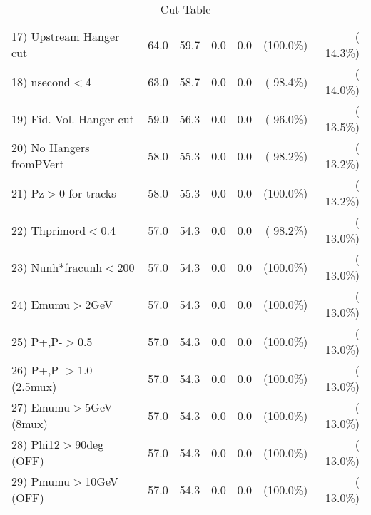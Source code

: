 \begin{table}[h!]
\begin{tabular}{||l||r|r|r|r|r|r||}
 17) Upstream Hanger cut  &         64.0 &         59.7 &          0.0 &          0.0 & (100.0\%) & ( 14.3\%) \\
 18) nsecond$<$4          &         63.0 &         58.7 &          0.0 &          0.0 & ( 98.4\%) & ( 14.0\%) \\
 19) Fid. Vol. Hanger cut &         59.0 &         56.3 &          0.0 &          0.0 & ( 96.0\%) & ( 13.5\%) \\
 20) No Hangers fromPVert &         58.0 &         55.3 &          0.0 &          0.0 & ( 98.2\%) & ( 13.2\%) \\
 21) Pz$>$0 for tracks    &         58.0 &         55.3 &          0.0 &          0.0 & (100.0\%) & ( 13.2\%) \\
 22) Thprimord$<$0.4      &         57.0 &         54.3 &          0.0 &          0.0 & ( 98.2\%) & ( 13.0\%) \\
 23) Nunh*fracunh$<$200   &         57.0 &         54.3 &          0.0 &          0.0 & (100.0\%) & ( 13.0\%) \\
 24) Emumu$>$2GeV         &         57.0 &         54.3 &          0.0 &          0.0 & (100.0\%) & ( 13.0\%) \\
 25) P+,P-$>$0.5          &         57.0 &         54.3 &          0.0 &          0.0 & (100.0\%) & ( 13.0\%) \\
 26) P+,P-$>$1.0 (2.5mux) &         57.0 &         54.3 &          0.0 &          0.0 & (100.0\%) & ( 13.0\%) \\
 27) Emumu$>$5GeV  (8mux) &         57.0 &         54.3 &          0.0 &          0.0 & (100.0\%) & ( 13.0\%) \\
 28) Phi12$>$90deg  (OFF) &         57.0 &         54.3 &          0.0 &          0.0 & (100.0\%) & ( 13.0\%) \\
 29) Pmumu$>$10GeV  (OFF) &         57.0 &         54.3 &          0.0 &          0.0 & (100.0\%) & ( 13.0\%) \\
 \hline
 \hline
 \end{tabular}
 \caption{Cut Table           }
 \label{tab-cutcohjpsi-mumu_jpsi}
 \end{table}
